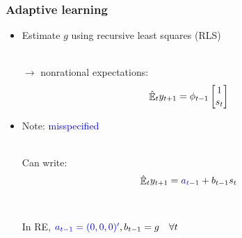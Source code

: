 \documentclass{beamer}
\DeclareMathOperator{\E}{\mathbb{E}}
\begin{document}
\begin{frame}
	\frametitle{Adaptive learning}
	\label{adaptive_learning}

\begin{itemize}
\item Estimate $g$ using recursive least squares (RLS)
  \\
  
  \
  
$\rightarrow$ nonrational expectations:
\begin{equation} 
\hat{\E}_t y_{t+1} = \phi_{t-1}\begin{bmatrix} \textcolor{blue}{1} \\ s_{t} \end{bmatrix} \label{PLMcompact}
\end{equation}

\item Note: \textcolor{blue}{misspecified}	\\

\

Can write:
\begin{equation}
\hat{\E}_t y_{t+1} = \textcolor{blue}{a_{t-1}} + b_{t-1}s_t  \label{PLM_fcst_general}
\end{equation}

\

In RE, $\textcolor{blue}{a_{t-1} = (0,0,0)'}, b_{t-1} = g \quad \forall t$
\end{itemize}


\end{frame}
\end{document}
